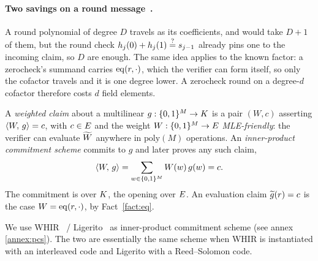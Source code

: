 \paragraph{Two savings on a round message~\cite{Gru24}.} A round polynomial of degree $D$ travels as its coefficients, and would take $D+1$ of them, but the round check $h_j(0)+h_j(1)\stackrel{?}{=} s_{j-1}$ already pins one to the incoming claim, so $D$ are enough. The same idea applies to the known factor: a zerocheck's summand carries $\operatorname{eq}(r,\cdot)$, which the verifier can form itself, so only the cofactor travels and it is one degree lower. A zerocheck round on a degree-$d$ cofactor therefore costs $d$ field elements.

\begin{definition}\label{def:ipcs}
A \emph{weighted claim} about a multilinear $g:\{0,1\}^{M}\to K$ is a pair $(W,c)$ asserting $\langle W,\, g \rangle=c$, with $c\in E$ and the weight $W:\{0,1\}^{M}\to E$ \emph{MLE-friendly}: the verifier can evaluate $\widetilde{W}$ anywhere in $\mathrm{poly}(M)$ operations. An \emph{inner-product commitment scheme} commits to $g$ and later proves any such claim,
\[
  \langle W,\, g \rangle=\sum_{w\in\{0,1\}^{M}}W(w)\,g(w)=c .
\]
The commitment is over $K$, the opening over $E$. An evaluation claim $\widetilde{g}(r)=c$ is the case $W=\operatorname{eq}(r,\cdot)$, by Fact~\ref{fact:eq}.
\end{definition}

We use WHIR~\cite{ACFY25} / Ligerito~\cite{NA25} as inner-product commitment scheme (see annex \ref{annex:pcs}). The two are essentially the same scheme when WHIR is instantiated with an interleaved code and Ligerito with a Reed--Solomon code.
